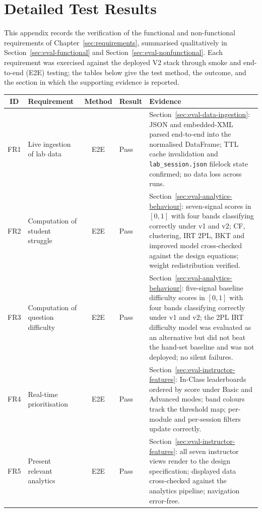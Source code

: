 \section{Detailed Test Results} \label{app:detailed-test-results}

This appendix records the verification of the functional and non-functional requirements of Chapter~\ref{sec:requirements}, summarised qualitatively in Section~\ref{sec:eval-functional} and Section~\ref{sec:eval-nonfunctional}. Each requirement was exercised against the deployed V2 stack through smoke and end-to-end (E2E) testing; the tables below give the test method, the outcome, and the section in which the supporting evidence is reported.

\begin{table}[H]
\centering
\small
\renewcommand{\arraystretch}{1.3}
\begin{tabularx}{\textwidth}{|c|p{}|c|p{}|X|}
\hline
\textbf{ID} & \textbf{Requirement} & \textbf{Method} & \textbf{Result} & \textbf{Evidence} \\
\hline\hline
FR1 & Live ingestion of lab data & E2E & Pass & Section~\ref{sec:eval-data-ingestion}: JSON and embedded-XML parsed end-to-end into the normalised DataFrame; TTL cache invalidation and \texttt{lab\_session.json} filelock state confirmed; no data loss across runs. \\
\hline
FR2 & Computation of student struggle & E2E & Pass & Section~\ref{sec:eval-analytics-behaviour}: seven-signal scores in $[0,1]$ with four bands classifying correctly under v1 and v2; CF, clustering, IRT 2PL, BKT and improved model cross-checked against the design equations; weight redistribution verified. \\
\hline
FR3 & Computation of question difficulty & E2E & Pass & Section~\ref{sec:eval-analytics-behaviour}: five-signal baseline difficulty scores in $[0,1]$ with four bands classifying correctly under v1 and v2; the 2PL IRT difficulty model was evaluated as an alternative but did not beat the hand-set baseline and was not deployed; no silent failures. \\
\hline
FR4 & Real-time prioritisation & E2E & Pass & Section~\ref{sec:eval-instructor-features}: In-Class leaderboards ordered by score under Basic and Advanced modes; band colours track the threshold map; per-module and per-session filters update correctly. \\
\hline
FR5 & Present relevant analytics & E2E & Pass & Section~\ref{sec:eval-instructor-features}: all seven instructor views render to the design specification; displayed data cross-checked against the analytics pipeline; navigation error-free. \\

\end{tabularx}
\end{table}

